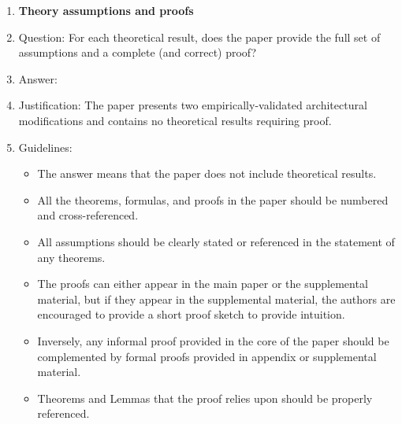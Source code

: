 \begin{enumerate}
\begin{itemize}
        \item The authors should discuss the computational efficiency of the proposed algorithms and how they scale with dataset size.
        \item If applicable, the authors should discuss possible limitations of their approach to address problems of privacy and fairness.
        \item While the authors might fear that complete honesty about limitations might be used by reviewers as grounds for rejection, a worse outcome might be that reviewers discover limitations that aren't acknowledged in the paper. The authors should use their best judgment and recognize that individual actions in favor of transparency play an important role in developing norms that preserve the integrity of the community. Reviewers will be specifically instructed to not penalize honesty concerning limitations.
    \end{itemize}

\item {\bf Theory assumptions and proofs}
    \item[] Question: For each theoretical result, does the paper provide the full set of assumptions and a complete (and correct) proof?
    \item[] Answer: \answerNA{}
    \item[] Justification: The paper presents two empirically-validated architectural modifications and contains no theoretical results requiring proof.
    \item[] Guidelines:
    \begin{itemize}
        \item The answer \answerNA{} means that the paper does not include theoretical results. 
        \item All the theorems, formulas, and proofs in the paper should be numbered and cross-referenced.
        \item All assumptions should be clearly stated or referenced in the statement of any theorems.
        \item The proofs can either appear in the main paper or the supplemental material, but if they appear in the supplemental material, the authors are encouraged to provide a short proof sketch to provide intuition. 
        \item Inversely, any informal proof provided in the core of the paper should be complemented by formal proofs provided in appendix or supplemental material.
        \item Theorems and Lemmas that the proof relies upon should be properly referenced. 
    \end{itemize}


\end{enumerate}

